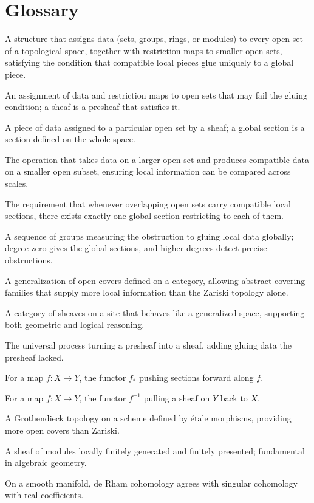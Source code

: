 \section*{Glossary}
\begin{description}[leftmargin=*,style=nextline,itemsep=0.3em]
\item[\textbf{Sheaf.}] A structure that assigns data (sets, groups, rings, or modules) to every open set of a topological space, together with restriction maps to smaller open sets, satisfying the condition that compatible local pieces glue uniquely to a global piece.
\item[\textbf{Presheaf.}] An assignment of data and restriction maps to open sets that may fail the gluing condition; a sheaf is a presheaf that satisfies it.
\item[\textbf{Section.}] A piece of data assigned to a particular open set by a sheaf; a global section is a section defined on the whole space.
\item[\textbf{Restriction map.}] The operation that takes data on a larger open set and produces compatible data on a smaller open subset, ensuring local information can be compared across scales.
\item[\textbf{Sheaf condition.}] The requirement that whenever overlapping open sets carry compatible local sections, there exists exactly one global section restricting to each of them.
\item[\textbf{Sheaf cohomology.}] A sequence of groups measuring the obstruction to gluing local data globally; degree zero gives the global sections, and higher degrees detect precise obstructions.
\item[\textbf{Grothendieck topology.}] A generalization of open covers defined on a category, allowing abstract covering families that supply more local information than the Zariski topology alone.
\item[\textbf{Topos.}] A category of sheaves on a site that behaves like a generalized space, supporting both geometric and logical reasoning.
\item[\textbf{Sheafification.}] The universal process turning a presheaf into a sheaf, adding gluing data the presheaf lacked.
\item[\textbf{Direct image functor.}] For a map $f\colon X\to Y$, the functor $f_*$ pushing sections forward along $f$.
\item[\textbf{Inverse image functor.}] For a map $f\colon X\to Y$, the functor $f^{-1}$ pulling a sheaf on $Y$ back to $X$.
\item[\textbf{\'Etale topology.}] A Grothendieck topology on a scheme defined by \'etale morphisms, providing more open covers than Zariski.
\item[\textbf{Coherent sheaf.}] A sheaf of modules locally finitely generated and finitely presented; fundamental in algebraic geometry.
\item[\textbf{De Rham theorem.}] On a smooth manifold, de Rham cohomology agrees with singular cohomology with real coefficients.
\end{description}
